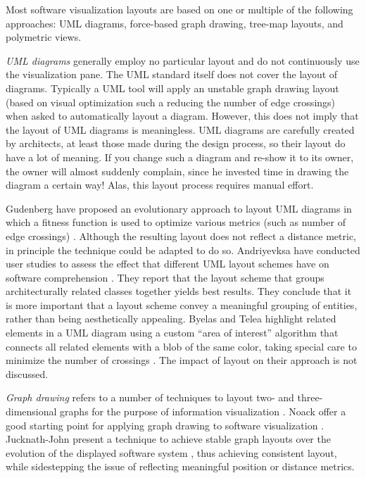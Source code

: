 Most software visualization layouts are based on one or multiple of the following approaches: UML diagrams, force-based graph drawing, tree-map layouts, and polymetric views.

\emph{UML diagrams} generally employ no particular layout and do not continuously use the visualization pane. The UML standard itself does not cover the layout of diagrams. Typically a UML tool will apply an unstable graph drawing layout (\eg based on visual optimization such a reducing the number of edge crossings) when asked to automatically layout a diagram. However, this does not imply that the layout of UML diagrams is meaningless. UML diagrams are carefully created by architects, at least those made during the design process, so their layout do have a lot of meaning. If you change such a diagram and re-show it to its owner, the owner will almost suddenly complain, since he invested time in drawing the diagram a certain way! Alas, this layout process requires manual effort.

Gudenberg \etal have proposed an evolutionary approach to layout UML diagrams in which a fitness function is used to optimize various metrics (such as number of edge crossings) \cite{Gude06a}. Although the resulting layout does not reflect a distance metric, in principle the technique could be adapted to do so. Andriyevksa \etal have conducted user studies to assess the effect that different UML layout schemes have on software comprehension \cite{Andr05a}.
They report that the layout scheme that groups architecturally related classes together yields best results. They conclude that it is more important that a layout scheme convey %
a meaningful grouping of entities, rather than being aesthetically appealing. Byelas and Telea highlight related elements in a UML
diagram using a custom ``area of interest'' algorithm that connects all related elements with a blob of the same color, taking special care to minimize the number of crossings \cite{Byel06a}.
The impact of layout on their approach is not discussed.

\emph{Graph drawing} refers to a number of techniques to layout two- and three-dimensional graphs for the purpose of information visualization \cite{Ware04a,Kauf01b}. Noack \etal offer a good starting point for applying graph drawing to software visualization \cite{Noac05a}. Jucknath-John \etal present a technique to achieve stable graph layouts over the evolution of the displayed software system \cite{Juck06a}, thus achieving consistent layout, while sidestepping the issue of reflecting meaningful position or distance metrics.


